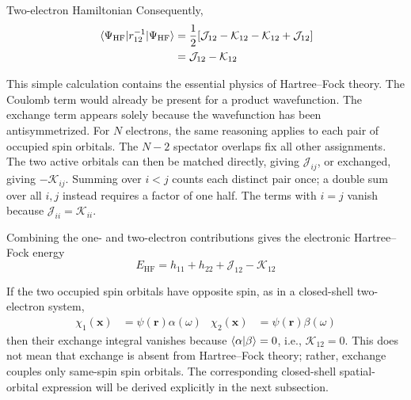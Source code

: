 \documentclass[11pt,a4paper,titlepage]{article}
\numberwithin{equation}{section}
\newcommand{\br}{\boldsymbol{r}}
\newcommand{\bx}{\boldsymbol{x}}
\newcommand{\cJ}{\mathcal{J}}
\newcommand{\cK}{\mathcal{K}}
\begin{document}
\begin{hfsolution}{Two-electron Hamiltonian}
Consequently,
\begin{equation}
\begin{split}
  \mel{\Psi_\text{HF}}{r_{12}^{-1}}{\Psi_\text{HF}}
  &=
  \frac{1}{2}
  [
    \cJ_{12}
    -
    \cK_{12}
    -
    \cK_{12}
    +
    \cJ_{12}
  ]
  \\
  &=
  \cJ_{12}-\cK_{12}
\end{split}
\end{equation}

This simple calculation contains the essential physics of Hartree--Fock
theory. The Coulomb term would already be present for a product
wavefunction. The exchange term appears solely because the wavefunction has
been antisymmetrized.
For $N$ electrons, the same reasoning applies to each pair of occupied
spin orbitals. The $N-2$ spectator overlaps fix all other assignments.
The two active orbitals can then be matched directly, giving
$\cJ_{ij}$, or exchanged, giving $-\cK_{ij}$. Summing over $i<j$
counts each distinct pair once; a double sum over all $i,j$ instead
requires a factor of one half. The terms with $i=j$ vanish because
$\cJ_{ii}=\cK_{ii}$.

Combining the one- and two-electron contributions gives the electronic
Hartree--Fock energy
\begin{equation}
  E_\text{HF}
  =
  h_{11}
  +
  h_{22}
  +
  \cJ_{12}
  -
  \cK_{12}
  \label{eq:two-electron-hf-energy}
\end{equation}

If the two occupied spin orbitals have opposite spin, as in a closed-shell
two-electron system,
\begin{align}
  \chi_1(\bx)&=\psi(\br)\alpha(\omega)
  &
  \chi_2(\bx)&=\psi(\br)\beta(\omega)
\end{align}
then their exchange integral vanishes because
$\braket{\alpha}{\beta}=0$, i.e., $\cK_{12}=0$.
This does not mean that exchange is absent from Hartree--Fock theory; rather,
exchange couples only same-spin spin orbitals. The corresponding
closed-shell spatial-orbital expression will be derived explicitly in the
next subsection.

\end{hfsolution}

\end{document}
